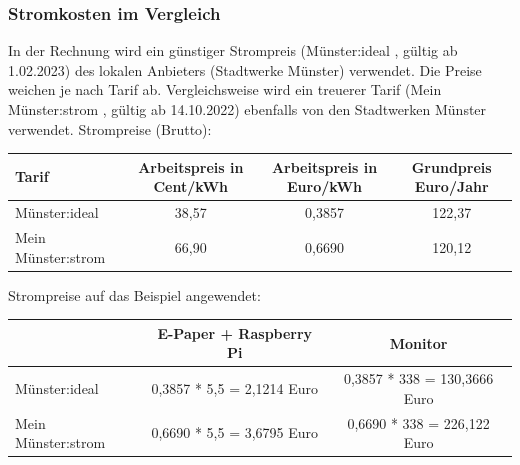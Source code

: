 \documentclass[10pt]{article}
\begin{document}
\subsubsection{Stromkosten im Vergleich} \label{Stromkosten}
In der Rechnung wird ein günstiger Strompreis (Münster:ideal \cite{münsterideal}, gültig ab 1.02.2023) des lokalen Anbieters (Stadtwerke Münster) verwendet. Die Preise weichen je nach Tarif ab. Vergleichsweise wird ein treuerer Tarif (Mein Münster:strom \cite{mein_MünsterStrom}, gültig ab 14.10.2022) ebenfalls von den Stadtwerken Münster verwendet.   \newline
\noindent
\newline
\noindent
Strompreise (Brutto):
\newline
\begin{tabular}{|l|c|c|c|}
\hline
    Tarif &  Arbeitspreis in Cent/kWh & Arbeitspreis in Euro/kWh & Grundpreis Euro/Jahr\\ \hline
    Münster:ideal & 38,57 & 0,3857 & 122,37\\ \hline
    Mein Münster:strom & 66,90 & 0,6690 & 120,12 \\ \hline
\end{tabular}
\newline
\newline

\noindent
Strompreise auf das Beispiel angewendet:
\newline
\begin{tabular}{|l|c|c|}
\hline
      & E-Paper + Raspberry Pi & Monitor \\ \hline
    Münster:ideal  & 0,3857 * 5,5 = 2,1214 Euro & 0,3857 * 338 = 130,3666 Euro\\ \hline
    Mein Münster:strom  & 0,6690 * 5,5 = 3,6795 Euro & 0,6690 * 338 = 226,122 Euro \\ \hline
\end{tabular}
\newline

\noindent
%
\end{document}
